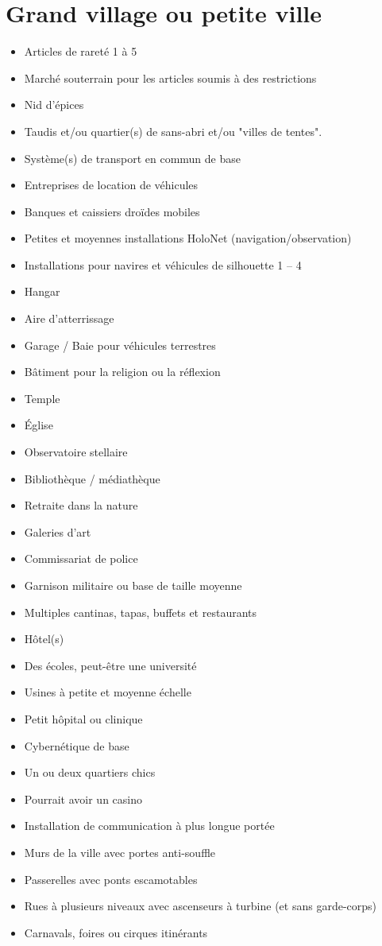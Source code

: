 \documentclass{article}
\begin{document}
\section*{Grand village ou petite ville}
\begin{multicols}{2}
	\begin{itemize}
		\item Articles de rareté 1 à 5
		\item Marché souterrain pour les articles soumis à des restrictions
		\item Nid d'épices
		\item Taudis et/ou quartier(s) de sans-abri et/ou "villes de tentes".
		\item Système(s) de transport en commun de base
		\item Entreprises de location de véhicules
		\item Banques et caissiers droïdes mobiles
		\item Petites et moyennes installations HoloNet (navigation/observation)
		\item Installations pour navires et véhicules de silhouette 1 -- 4
		\item Hangar
		\item Aire d'atterrissage
		\item Garage / Baie pour véhicules terrestres
		\item Bâtiment pour la religion ou la réflexion
		\item Temple
		\item Église
		\item Observatoire stellaire
		\item Bibliothèque / médiathèque
		\item Retraite dans la nature
		\item Galeries d'art
		\item Commissariat de police
		\item Garnison militaire ou base de taille moyenne
		\item Multiples cantinas, tapas, buffets et restaurants
		\item Hôtel(s)
		\item Des écoles, peut-être une université
		\item Usines à petite et moyenne échelle
		\item Petit hôpital ou clinique
		\item Cybernétique de base
		\item Un ou deux quartiers chics
		\item Pourrait avoir un casino
		\item Installation de communication à plus longue portée
		\item Murs de la ville avec portes anti-souffle
		\item Passerelles avec ponts escamotables
		\item Rues à plusieurs niveaux avec ascenseurs à turbine (et sans garde-corps)
		\item Carnavals, foires ou cirques itinérants
	\end{itemize}
\end{multicols}
\end{document}
